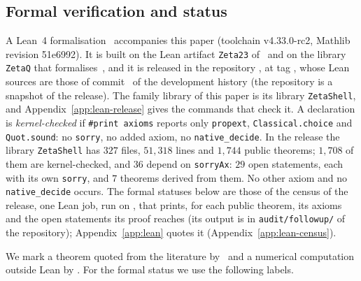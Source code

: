 \subsection{Formal verification and status}\label{ssec:formal}
A Lean~4 formalisation~\cite{Lean4} accompanies this paper (toolchain v4.33.0-rc2, Mathlib~\cite{Mathlib} revision 51e6992). It is built on the
Lean artifact \texttt{Zeta23} of~\cite{AF} and on the library \texttt{ZetaQ} that formalises~\cite{DSouza}, and it is released in the repository
\repourl, at tag \repotag, whose Lean sources are those of commit \relcommit\ of the development history (the repository is a snapshot of the
release). The family library of this paper is its library \texttt{ZetaShell}, and Appendix~\ref{app:lean-release} gives the commands that check
it. A declaration is \emph{kernel-checked} if \texttt{\#print axioms} reports only \texttt{propext}, \texttt{Classical.choice} and
\texttt{Quot.sound}: no \texttt{sorry}, no added axiom, no \texttt{native\_decide}. In the release the library \texttt{ZetaShell} has $327$ files,
$51{,}318$ lines and $1{,}744$ public theorems; $1{,}708$ of them are kernel-checked, and $36$ depend on \texttt{sorryAx}: $29$ open statements,
each with its own \texttt{sorry}, and $7$ theorems derived from them. No other axiom and no \texttt{native\_decide} occurs. The formal statuses
below are those of the census of the release, one Lean job, run on \censusref, that prints, for each public theorem, its axioms and the open
statements its proof reaches (its output is in \texttt{audit/followup/} of the repository); Appendix~\ref{app:lean} quotes it
(Appendix~\ref{app:lean-census}).

We mark a theorem quoted from the literature by \tagC\ and a numerical computation outside Lean by \tagN. For the formal status we use the
following labels.

